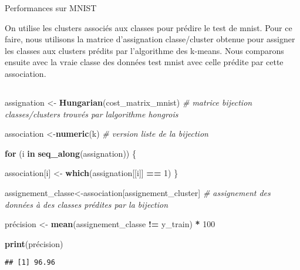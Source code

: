 \documentclass[
]{article}
\newenvironment{Shaded}{\begin{snugshade}}{\end{snugshade}}
\newcommand{\CommentTok}[1]{\textcolor[rgb]{0.56,0.35,0.01}{\textit{#1}}}
\newcommand{\ControlFlowTok}[1]{\textcolor[rgb]{0.13,0.29,0.53}{\textbf{#1}}}
\newcommand{\DecValTok}[1]{\textcolor[rgb]{0.00,0.00,0.81}{#1}}
\newcommand{\FunctionTok}[1]{\textcolor[rgb]{0.13,0.29,0.53}{\textbf{#1}}}
\newcommand{\NormalTok}[1]{#1}
\newcommand{\OtherTok}[1]{\textcolor[rgb]{0.56,0.35,0.01}{#1}}
\newcommand{\SpecialCharTok}[1]{\textcolor[rgb]{0.81,0.36,0.00}{\textbf{#1}}}
\begin{document}
Performances sur MNIST

On utilise les clusters associés aux classes pour prédire le test de
mnist. Pour ce faire, nous utilisons la matrice d'assignation
classe/cluster obtenue pour assigner les classes aux clusters prédits
par l'algorithme des k-means. Nous comparons ensuite avec la vraie
classe des données test mnist avec celle prédite par cette association.

\hypertarget{section-17}{%
\subsection{}\label{section-17}}

\begin{Shaded}
\begin{Highlighting}[]
\NormalTok{assignation }\OtherTok{\textless{}{-}} \FunctionTok{Hungarian}\NormalTok{(cost\_matrix\_mnist) }\CommentTok{\# matrice bijection classes/clusters trouvés par l\textquotesingle{}algorithme hongrois}

\NormalTok{association }\OtherTok{\textless{}{-}}\FunctionTok{numeric}\NormalTok{(k) }\CommentTok{\# version liste de la bijection}

\ControlFlowTok{for}\NormalTok{ (i }\ControlFlowTok{in} \FunctionTok{seq\_along}\NormalTok{(assignation)) \{}
  
\NormalTok{  association[i] }\OtherTok{\textless{}{-}} \FunctionTok{which}\NormalTok{(assignation[[i]] }\SpecialCharTok{==} \DecValTok{1}\NormalTok{)}
\NormalTok{\}}

\NormalTok{assignement\_classe}\OtherTok{\textless{}{-}}\NormalTok{association[assignement\_cluster] }\CommentTok{\# assignement des données à des classes prédites par la bijection}

\NormalTok{précision }\OtherTok{\textless{}{-}} \FunctionTok{mean}\NormalTok{(assignement\_classe }\SpecialCharTok{!=}\NormalTok{ y\_train) }\SpecialCharTok{*} \DecValTok{100} 

\FunctionTok{print}\NormalTok{(précision)}
\end{Highlighting}
\end{Shaded}

\begin{verbatim}
## [1] 96.96
\end{verbatim}

\hypertarget{section-18}{%
\subsection{}\label{section-18}}
\end{document}
